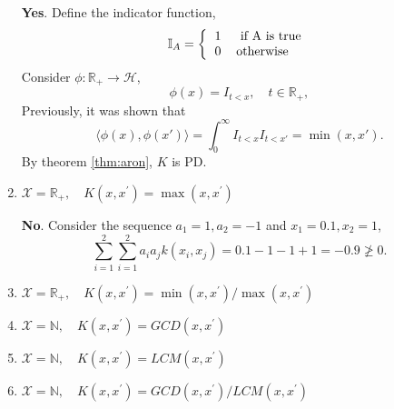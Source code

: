 \documentclass{article}[12pt]
\begin{document}
\begin{enumerate}
\textbf{Yes}. Define the indicator function,
\begin{equation}
\mathbb{I}_A =  \left\{
\begin{tabular}{ll}
1 & \mbox{ if A is true}\\
0 & \mbox{otherwise}
\end{tabular}
\right.
\end{equation}
Consider $\phi: \mathbb R_+ \rightarrow \mathcal H$,
\begin{equation}
\phi(x) = I_{t<x}, \quad t \in \mathbb R _+,
\end{equation}
Previously, it was shown that
\begin{equation}
\langle \phi(x), \phi(x') \rangle = \int_0^{\infty} I_{t < x} I_{t < x'}= \operatorname{min}(x, x').
\end{equation}
By theorem \ref{thm:aron}, $K$ is PD.

\item $\mathcal{X}=\mathbb{R}_{+}, \quad K\left(x, x^{\prime}\right)=\max \left(x, x^{\prime}\right)$

\textbf{No}. Consider the sequence $a_1=1, a_2=-1$ and $x_1=0.1, x_2=1$,
\begin{equation}
\sum_{i=1}^{2} \sum_{i=1}^{2} a_i a_j k(x_i, x_j) = 0.1 -1 -1 + 1 = -0.9 \not \ge 0.
\end{equation}


\item $\mathcal{X}=\mathbb{R}_{+}, \quad K\left(x, x^{\prime}\right)=\min \left(x, x^{\prime}\right) / \max \left(x, x^{\prime}\right)$

\item $\mathcal{X}=\mathbb{N}, \quad K\left(x, x^{\prime}\right)=G C D\left(x, x^{\prime}\right)$

\item $\mathcal{X}=\mathbb{N}, \quad K\left(x, x^{\prime}\right)=L C M\left(x, x^{\prime}\right)$

\item $\mathcal{X}=\mathbb{N}, \quad K\left(x, x^{\prime}\right)=G C D\left(x, x^{\prime}\right) / L C M\left(x, x^{\prime}\right)$

\end{enumerate}
\end{document}
